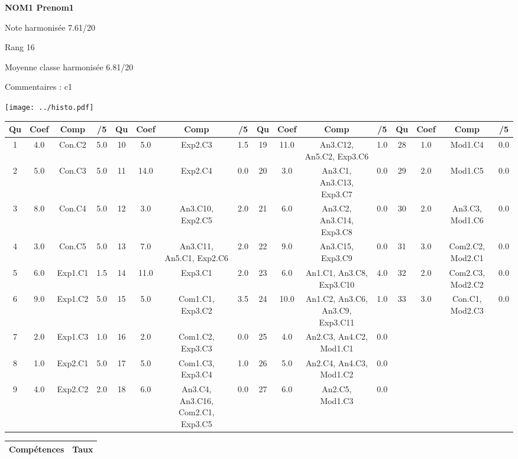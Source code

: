 \begin{minipage}[c]{.45\linewidth} 
\Large \textbf{\textsf{NOM1 Prenom1}} 
 
 \normalsize Note harmonisée 7.61/20 
 
Rang 16
 
Moyenne classe harmonisée 6.81/20 
 
Commentaires : 
c1 
\end{minipage}\hfill 
\begin{minipage}[c]{.45\linewidth}  
\begin{center}
\texttt{[image: ../histo.pdf]} 
\end{center}
\end{minipage}
\footnotesize 
\begin{center} 
\begin{tabular}{|c|c|c|c||c|c|c|c||c|c|c|c||c|c|c|c|} 
\hline \textbf{Qu} & \textbf{Coef} & \textbf{Comp} & \textbf{/5} & \textbf{Qu} & \textbf{Coef} & \textbf{Comp} & \textbf{/5} & \textbf{Qu} & \textbf{Coef} & \textbf{Comp} & \textbf{/5} & \textbf{Qu} & \textbf{Coef} & \textbf{Comp} & \textbf{/5} \\ 
\hline 
\hline 
1 & 4.0 & Con.C2 & 5.0 & 10 & 5.0 & Exp2.C3 & 1.5 & 19 & 11.0 & An3.C12, An5.C2, Exp3.C6 & 1.0 & 28 & 1.0 & Mod1.C4 & 0.0 \\ \hline 
2 & 5.0 & Con.C3 & 5.0 & 11 & 14.0 & Exp2.C4 & 0.0 & 20 & 3.0 & An3.C1, An3.C13, Exp3.C7 & 0.0 & 29 & 2.0 & Mod1.C5 & 0.0 \\ \hline 
3 & 8.0 & Con.C4 & 5.0 & 12 & 3.0 & An3.C10, Exp2.C5 & 2.0 & 21 & 6.0 & An3.C2, An3.C14, Exp3.C8 & 0.0 & 30 & 2.0 & An3.C3, Mod1.C6 & 0.0 \\ \hline 
4 & 3.0 & Con.C5 & 5.0 & 13 & 7.0 & An3.C11, An5.C1, Exp2.C6 & 2.0 & 22 & 9.0 & An3.C15, Exp3.C9 & 0.0 & 31 & 3.0 & Com2.C2, Mod2.C1 & 0.0 \\ \hline 
5 & 6.0 & Exp1.C1 & 1.5 & 14 & 11.0 & Exp3.C1 & 2.0 & 23 & 6.0 & An1.C1, An3.C8, Exp3.C10 & 4.0 & 32 & 2.0 & Com2.C3, Mod2.C2 & 0.0 \\ \hline 
6 & 9.0 & Exp1.C2 & 5.0 & 15 & 5.0 & Com1.C1, Exp3.C2 & 3.5 & 24 & 10.0 & An1.C2, An3.C6, An3.C9, Exp3.C11 & 1.0 & 33 & 3.0 & Con.C1, Mod2.C3 & 0.0 \\ \hline 
7 & 2.0 & Exp1.C3 & 1.0 & 16 & 2.0 & Com1.C2, Exp3.C3 & 0.0 & 25 & 4.0 & An2.C3, An4.C2, Mod1.C1 & 0.0 &  &  &  &  \\ \hline 

8 & 1.0 & Exp2.C1 & 5.0 & 17 & 5.0 & Com1.C3, Exp3.C4 & 1.0 & 26 & 5.0 & An2.C4, An4.C3, Mod1.C2 & 0.0 &  &  &  &  \\ \hline 

9 & 4.0 & Exp2.C2 & 2.0 & 18 & 6.0 & An3.C4, An3.C16, Com2.C1, Exp3.C5 & 0.0 & 27 & 6.0 & An2.C5, Mod1.C3 & 0.0 &  &  &  &  \\ \hline 

\end{tabular} 
\end{center} 
\normalsize 
 
\footnotesize 
\begin{center} 
\begin{tabular}{|p{.7\linewidth}|c|} 
\hline 
Compétences  & Taux \\ \hline \hline 
\end{tabular} 
\end{center} 
\normalsize 
 
